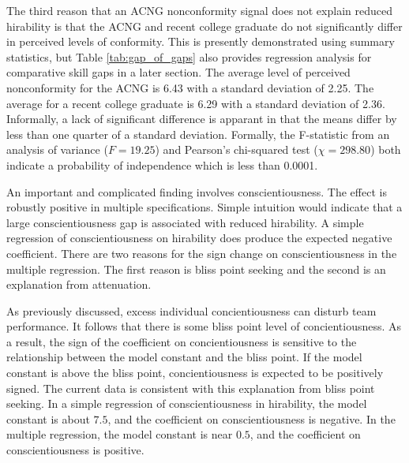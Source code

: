 \documentclass[review]{elsarticle}
\begin{document}
The third reason that an ACNG nonconformity signal does not explain reduced hirability is that the ACNG and recent college graduate do not significantly differ in perceived levels of conformity.
This is presently demonstrated using summary statistics, but Table \ref{tab:gap_of_gaps} also provides regression analysis for comparative skill gaps in a later section.
The average level of perceived nonconformity for the ACNG is 6.43 with a standard deviation of 2.25.
The average for a recent college graduate is 6.29 with a standard deviation of 2.36.
Informally, a lack of significant difference is apparant in that the means differ by less than one quarter of a standard deviation.
Formally, the F-statistic from an analysis of variance ($F = 19.25$) and Pearson's chi-squared test ($\chi = 298.80$) both indicate a probability of independence which is less than 0.0001.

An important and complicated finding involves conscientiousness.
The effect is robustly positive in multiple specifications.
Simple intuition would indicate that a large conscientiousness gap is associated with reduced hirability.
A simple regression of conscientiousness on hirability does produce the expected negative coefficient.
There are two reasons for the sign change on conscientiousness in the multiple regression.
The first reason is bliss point seeking and the second is an explanation from attenuation.

As previously discussed, excess individual concientiousness can disturb team performance\cite{curcseu2019personality}.
It follows that there is some bliss point level of concientiousness.
As a result, the sign of the coefficient on concientiousness is sensitive to the relationship between the model constant and the bliss point.
If the model constant is above the bliss point, concientiousness is expected to be positively signed.
The current data is consistent with this explanation from bliss point seeking.
In a simple regression of conscientiousness in hirability, the model constant is about $7.5$, and the coefficient on conscientiousness is negative.
In the multiple regression, the model constant is near $0.5$, and the coefficient on conscientiousness is positive.

\end{document}
